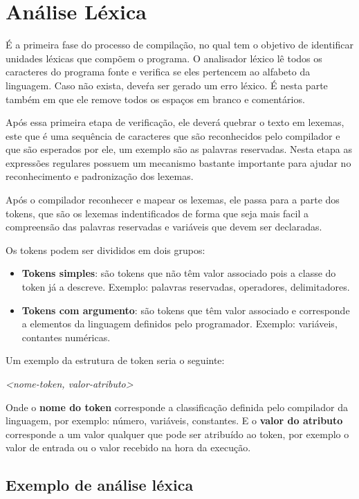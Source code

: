 \section{Análise Léxica}

É a primeira fase do processo de compilação, no qual tem o objetivo de identificar unidades léxicas que compõem o programa.
O analisador léxico lê todos os caracteres do programa fonte e verifica se eles pertencem ao alfabeto da linguagem.
Caso não exista, deveŕa ser gerado um erro léxico.
É nesta parte também em que ele remove todos os espaços em branco e comentários.

Após essa primeira etapa de verificação, ele deverá quebrar o texto em lexemas,
este que é uma sequência de caracteres que são reconhecidos pelo compilador e que são esperados por ele,
um exemplo são as palavras reservadas.
Nesta etapa as expressões regulares possuem um mecanismo bastante importante para ajudar no reconhecimento e padronização dos lexemas.

Após o compilador reconhecer e mapear os lexemas, ele passa para a parte dos tokens,
que são os lexemas indentificados de forma que seja mais facil a compreensão das palavras reservadas e variáveis que devem ser declaradas.

Os tokens podem ser divididos em dois grupos:

\begin{itemize}
  \item \textbf{Tokens simples}: são tokens que não têm valor associado pois a classe do token já a descreve.
    Exemplo: palavras reservadas, operadores, delimitadores.
  \item \textbf{Tokens com argumento}: são tokens que têm valor associado e corresponde a elementos da linguagem definidos pelo programador.
    Exemplo: variáveis, contantes numéricas.
\end{itemize}

Um exemplo da estrutura de token seria o seguinte:

\emph{<nome-token, valor-atributo>}

Onde o \textbf{nome do token} corresponde a classificação definida pelo compilador da linguagem, por exemplo: número, variáveis, constantes.
E o \textbf{valor do atributo} corresponde a um valor qualquer que pode ser atribuído ao token, por exemplo o valor de entrada ou o valor recebido na hora da execução.

\subsection{Exemplo de análise léxica}


